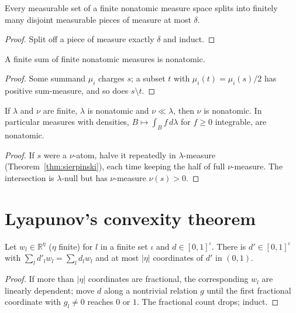 \begin{corollary}
\label{cor:fine_partition}
\leanok
{}
Every measurable set of a finite nonatomic measure space splits into finitely many disjoint measurable pieces of measure
at most $\delta$.
\end{corollary}
\begin{proof}
\leanok
Split off a piece of measure exactly $\delta$ and induct.
\end{proof}

\begin{lemma}
\label{lem:nonatomic_sum}
\leanok
{}
A finite sum of finite nonatomic measures is nonatomic.
\end{lemma}
\begin{proof}
\leanok
Some summand $\mu_i$ charges $s$; a subset $t$ with $\mu_i(t) = \mu_i(s)/2$ has positive sum-measure, and so does $s \setminus t$.
\end{proof}

\begin{lemma}
\label{lem:nonatomic_ac}
\leanok
{}
If $\lambda$ and $\nu$ are finite, $\lambda$ is nonatomic and $\nu \ll \lambda$, then $\nu$ is nonatomic. In particular
measures with densities, $B \mapsto \int_B f\,d\lambda$ for $f \ge 0$ integrable, are nonatomic.
\end{lemma}
\begin{proof}
\leanok
If $s$ were a $\nu$-atom, halve it repeatedly in $\lambda$-measure (Theorem~\ref{thm:sierpinski}), each time keeping the half
of full $\nu$-measure. The intersection is $\lambda$-null but has $\nu$-measure $\nu(s) > 0$.
\end{proof}

\section{Lyapunov's convexity theorem}
\label{sec:lyapunov}

\begin{lemma}
\label{lem:vertex}
\leanok
Let $w_l \in \mathbb{R}^\eta$ ($\eta$ finite) for $l$ in a finite set $\iota$ and $d \in [0,1]^\iota$. There is
$d' \in [0,1]^\iota$ with $\sum_l d'_l w_l = \sum_l d_l w_l$ and at most $|\eta|$ coordinates of $d'$ in $(0,1)$.
\end{lemma}
\begin{proof}
\leanok
If more than $|\eta|$ coordinates are fractional, the corresponding $w_l$ are linearly dependent; move $d$ along a nontrivial
relation $g$ until the first fractional coordinate with $g_l \ne 0$ reaches $0$ or $1$. The fractional count drops; induct.
\end{proof}

